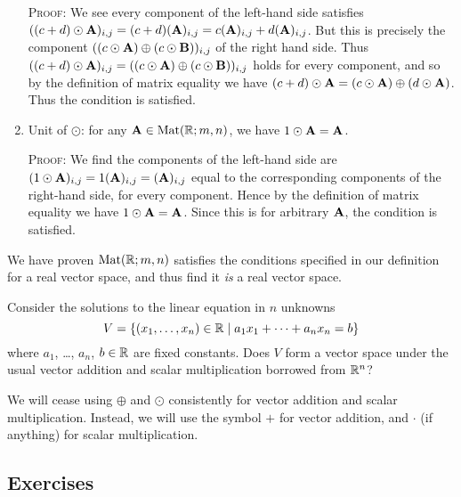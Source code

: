 \begin{example}
\begin{enumerate}[label=(\arabic*)]
  \textsc{Proof:} 
  We see every component of the left-hand side satisfies
  $((c+d)\odot\mathbf{A})_{i,j} = (c+d)(\mathbf{A})_{i,j} = c(\mathbf{A})_{i,j} + d(\mathbf{A})_{i,j}$.
  But this is precisely the component
  $((c\odot\mathbf{A})\oplus(c\odot\mathbf{B}))_{i,j}$ of the right hand
  side. Thus
  $((c+d)\odot\mathbf{A})_{i,j} = ((c\odot\mathbf{A})\oplus(c\odot\mathbf{B}))_{i,j}$
  holds for every component, and so by the definition of matrix equality
  we have $(c+d)\odot\mathbf{A} = (c\odot\mathbf{A})\oplus(d\odot\mathbf{A})$.
  Thus the condition is satisfied.
\item Unit of $\odot$: for any $\mathbf{A}\in\mathrm{Mat}(\mathbb{R};m,n)$, we have
  $1\odot\mathbf{A}=\mathbf{A}$.


  \textsc{Proof:} 
  We find the components of the left-hand side are
  $(1\odot\mathbf{A})_{i,j} = 1(\mathbf{A})_{i,j} = (\mathbf{A})_{i,j}$ equal to
  the corresponding components of the right-hand side, for every
  component. Hence by the definition of matrix equality we have
  $1\odot\mathbf{A}=\mathbf{A}$.
  Since this is for arbitrary $\mathbf{A}$, the condition is satisfied.
\end{enumerate}
We have proven $\mathrm{Mat}(\mathbb{R};m,n)$ satisfies the conditions specified in our
definition for a real vector space, and thus find it \emph{is} a real
vector space.
\end{example}

\label{puzzle:vector-spaces:solution-space}
Consider the solutions to the linear equation in $n$ unknowns
\begin{equation}
V = \{(x_{1},\dots,x_{n})\in\mathbb{R}\mid a_{1}x_{1}+\cdots+a_{n}x_{n}=b\}
\end{equation}
where $a_{1}$, \dots, $a_{n}$, $b\in\mathbb{R}$ are fixed constants.
Does $V$ form a vector space under the usual vector addition and scalar
multiplication borrowed from $\mathbb{R}^{n}$?

We will cease using $\oplus$ and $\odot$ consistently for vector
addition and scalar multiplication. Instead, we will use the symbol $+$
for vector addition, and $\cdot$ (if anything) for scalar multiplication.

\subsection*{Exercises}

